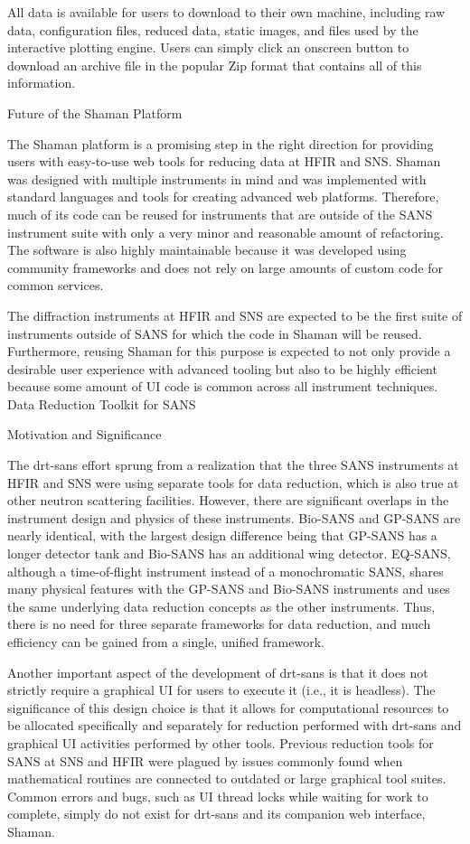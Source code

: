 All data is available for users to download to their own machine, including raw data, configuration
files, reduced data, static images, and files used by the interactive plotting engine. Users can
simply click an onscreen button to download an archive file in the popular Zip format that contains
all of this information.

Future of the Shaman Platform

The Shaman platform is a promising step in the right direction for providing users with easy-to-use
web tools for reducing data at HFIR and SNS. Shaman was designed with multiple instruments in mind
and was implemented with standard languages and tools for creating advanced web platforms.
Therefore, much of its code can be reused for instruments that are outside of the SANS instrument
suite with only a very minor and reasonable amount of refactoring. The software is also highly
maintainable because it was developed using community frameworks and does not rely on large amounts
of custom code for common services.

The diffraction instruments at HFIR and SNS are expected to be the first suite of instruments
outside of SANS for which the code in Shaman will be reused. Furthermore, reusing Shaman for this
purpose is expected to not only provide a desirable user experience with advanced tooling but also
to be highly efficient because some amount of UI code is common across all instrument techniques.
Data Reduction Toolkit for SANS

Motivation and Significance

The drt-sans effort sprung from a realization that the three SANS instruments at HFIR and SNS were
using separate tools for data reduction, which is also true at other neutron scattering facilities.
However, there are significant overlaps in the instrument design and physics of these instruments.
Bio-SANS and GP-SANS are nearly identical, with the largest design difference being that GP-SANS has
a longer detector tank and Bio-SANS has an additional wing detector. EQ-SANS, although a
time-of-flight instrument instead of a monochromatic SANS, shares many physical features with the
GP-SANS and Bio-SANS instruments and uses the same underlying data reduction concepts as the other
instruments. Thus, there is no need for three separate frameworks for data reduction, and much
efficiency can be gained from a single, unified framework.

Another important aspect of the development of drt-sans is that it does not strictly require a
graphical UI for users to execute it (i.e., it is headless). The significance of this design choice
is that it allows for computational resources to be allocated specifically and separately for
reduction performed with drt-sans and graphical UI activities performed by other tools. Previous
reduction tools for SANS at SNS and HFIR were plagued by issues commonly found when mathematical
routines are connected to outdated or large graphical tool suites. Common errors and bugs, such as
UI thread locks while waiting for work to complete, simply do not exist for drt-sans and its
companion web interface, Shaman.

